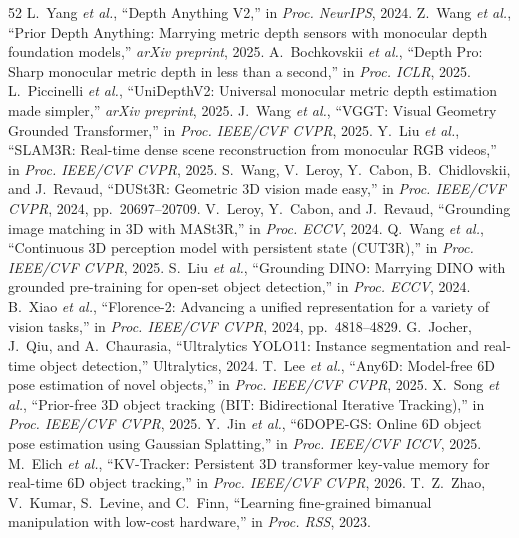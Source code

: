 \documentclass{evidencescene}
\begin{document}
\begin{thebibliography}{52}
 L.~Yang \emph{et al.}, ``Depth Anything V2,'' in \emph{Proc. NeurIPS}, 2024.
 Z.~Wang \emph{et al.}, ``Prior Depth Anything: Marrying metric depth sensors with monocular depth foundation models,'' \emph{arXiv preprint}, 2025.
 A.~Bochkovskii \emph{et al.}, ``Depth Pro: Sharp monocular metric depth in less than a second,'' in \emph{Proc. ICLR}, 2025.
 L.~Piccinelli \emph{et al.}, ``UniDepthV2: Universal monocular metric depth estimation made simpler,'' \emph{arXiv preprint}, 2025.
 J.~Wang \emph{et al.}, ``VGGT: Visual Geometry Grounded Transformer,'' in \emph{Proc. IEEE/CVF CVPR}, 2025.
 Y.~Liu \emph{et al.}, ``SLAM3R: Real-time dense scene reconstruction from monocular RGB videos,'' in \emph{Proc. IEEE/CVF CVPR}, 2025.
 S.~Wang, V.~Leroy, Y.~Cabon, B.~Chidlovskii, and J.~Revaud, ``DUSt3R: Geometric 3D vision made easy,'' in \emph{Proc. IEEE/CVF CVPR}, 2024, pp.~20697--20709.
 V.~Leroy, Y.~Cabon, and J.~Revaud, ``Grounding image matching in 3D with MASt3R,'' in \emph{Proc. ECCV}, 2024.
 Q.~Wang \emph{et al.}, ``Continuous 3D perception model with persistent state (CUT3R),'' in \emph{Proc. IEEE/CVF CVPR}, 2025.
 S.~Liu \emph{et al.}, ``Grounding DINO: Marrying DINO with grounded pre-training for open-set object detection,'' in \emph{Proc. ECCV}, 2024.
 B.~Xiao \emph{et al.}, ``Florence-2: Advancing a unified representation for a variety of vision tasks,'' in \emph{Proc. IEEE/CVF CVPR}, 2024, pp.~4818--4829.
 G.~Jocher, J.~Qiu, and A.~Chaurasia, ``Ultralytics YOLO11: Instance segmentation and real-time object detection,'' Ultralytics, 2024.
 T.~Lee \emph{et al.}, ``Any6D: Model-free 6D pose estimation of novel objects,'' in \emph{Proc. IEEE/CVF CVPR}, 2025.
 X.~Song \emph{et al.}, ``Prior-free 3D object tracking (BIT: Bidirectional Iterative Tracking),'' in \emph{Proc. IEEE/CVF CVPR}, 2025.
 Y.~Jin \emph{et al.}, ``6DOPE-GS: Online 6D object pose estimation using Gaussian Splatting,'' in \emph{Proc. IEEE/CVF ICCV}, 2025.
 M.~Elich \emph{et al.}, ``KV-Tracker: Persistent 3D transformer key-value memory for real-time 6D object tracking,'' in \emph{Proc. IEEE/CVF CVPR}, 2026.
 T.~Z.~Zhao, V.~Kumar, S.~Levine, and C.~Finn, ``Learning fine-grained bimanual manipulation with low-cost hardware,'' in \emph{Proc. RSS}, 2023.

\end{thebibliography}
\end{document}
